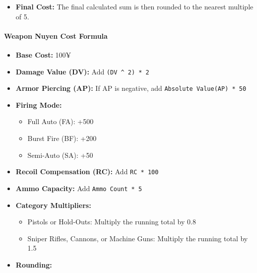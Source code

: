 \documentclass[
  oneside]{article}
\providecommand{\tightlist}{%
  \setlength{\itemsep}{0pt}\setlength{\parskip}{0pt}}
\begin{document}
\begin{multicols}{2}
\begin{itemize}
  \begin{itemize}
  \tightlist
  \item
    Thermographic Vision: +10
  \item
    Low-Light Vision: +5
  \item
    Built Tough (Rating): +10 per Rating point
  \item
    Reach (+1): +5
  \item
    Reach (+2): +10
  \item
    Reach (+3): +15
  \item
    Allergy: -15
  \end{itemize}
\item
  \textbf{Final Cost:} The final calculated sum is
  then rounded to the nearest multiple of 5.
\end{itemize}

\hypertarget{weapon-nuyen-cost-formula}{%
\paragraph{Weapon Nuyen Cost
Formula}\label{weapon-nuyen-cost-formula}}

\begin{itemize}
\tightlist
\item
  \textbf{Base Cost:} 100¥
\item
  \textbf{Damage Value (DV):} Add
  \texttt{(DV\ \^{}\ 2)\ *\ 2}
\item
  \textbf{Armor Piercing (AP):} If AP is negative,
  add \texttt{Absolute\ Value(AP)\ *\ 50}
\item
  \textbf{Firing Mode:}

  \begin{itemize}
  \tightlist
  \item
    Full Auto (FA): +500
  \item
    Burst Fire (BF): +200
  \item
    Semi-Auto (SA): +50
  \end{itemize}
\item
  \textbf{Recoil Compensation (RC):} Add
  \texttt{RC\ *\ 100}
\item
  \textbf{Ammo Capacity:} Add
  \texttt{Ammo\ Count\ *\ 5}
\item
  \textbf{Category Multipliers:}

  \begin{itemize}
  \tightlist
  \item
    Pistols or Hold-Outs: Multiply the running
    total by 0.8
  \item
    Sniper Rifles, Cannons, or Machine Guns:
    Multiply the running total by 1.5
  \end{itemize}
\item
  \textbf{Rounding:}


\end{itemize}
\end{multicols}
\end{document}

